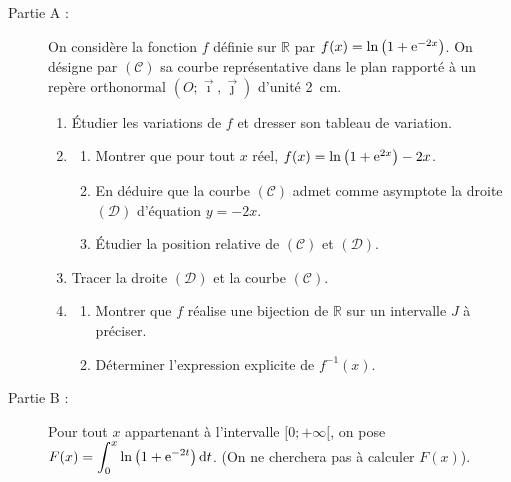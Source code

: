 %
\begin{exo}
      \begin{description}
            \item[Partie A :]
                  On consid\`ere la fonction $f$ d\'efinie sur $\mathbb{R}$ par $f(x) = \ln \left( 1 + \mathrm{e}^{-2x} \right)$.
                  On d\'esigne par $(\mathscr{C})$ sa courbe repr\'esentative dans le plan rapport\'e \`a un rep\`ere 
                  orthonormal $(O ; \vec{\imath} , \vec{\jmath} )$ d'unit\'e 2~cm.
                  \begin{enumerate}
                        \item \'Etudier les variations de $f$ et dresser son tableau de variation.
                        \item \begin{enumerate}
                                    \item Montrer que pour tout $x$ r\'eel, 
                                          $f(x) = \ln \left( 1 + \mathrm{e}^{2x} \right) - 2x $.
                                    \item En d\'eduire que la courbe $(\mathscr{C})$ admet comme asymptote la droite 
                                          $(\mathscr{D})$ d'\'equation $y = -2x$.
                                    \item \'Etudier la position relative de $(\mathscr{C})$ et $(\mathscr{D})$.
                              \end{enumerate}
                        \item Tracer la droite $(\mathscr{D})$ et la courbe $(\mathscr{C})$.
                        \item \begin{enumerate}
                                    \item Montrer que $f$ r\'ealise une bijection 
                                          de $\mathbb{R}$ sur un intervalle $J$ \`a pr\'eciser.
                                    \item D\'eterminer l'expression explicite de $f^{-1} (x)$.
                              \end{enumerate}
                  \end{enumerate}
            \item[Partie B :]
                  Pour tout $x$ appartenant \`a l'intervalle $[ 0 ; +\infty[$, 
                  on pose $F(x) = \displaystyle{\int_{0}^{x} \ln \left( 1 + \mathrm{e}^{-2t} \right) \mathrm{d}t}$.
                  (On ne cherchera pas \`a calculer $F(x)$).

\end{description}
\end{exo}
